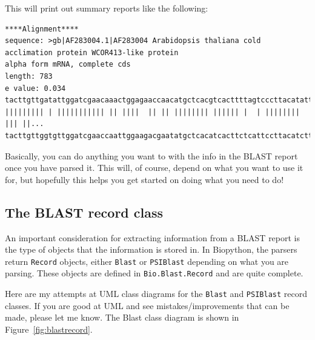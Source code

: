 \documentclass{report}
\begin{document}
This will print out summary reports like the following:

\begin{verbatim}
****Alignment****
sequence: >gb|AF283004.1|AF283004 Arabidopsis thaliana cold acclimation protein WCOR413-like protein
alpha form mRNA, complete cds
length: 783
e value: 0.034
tacttgttgatattggatcgaacaaactggagaaccaacatgctcacgtcacttttagtcccttacatattcctc...
||||||||| | ||||||||||| || ||||  || || |||||||| |||||| |  | |||||||| ||| ||...
tacttgttggtgttggatcgaaccaattggaagacgaatatgctcacatcacttctcattccttacatcttcttc...
\end{verbatim}

Basically, you can do anything you want to with the info in the BLAST
report once you have parsed it. This will, of course, depend on what
you want to use it for, but hopefully this helps you get started on
doing what you need to do!

\subsection{The BLAST record class}

An important consideration for extracting information from a BLAST report is the type of objects that the information is stored in. In Biopython, the parsers return \verb|Record| objects, either \verb|Blast| or \verb|PSIBlast| depending on what you are parsing. These objects are defined in \verb|Bio.Blast.Record| and are quite complete.


Here are my attempts at UML class diagrams for the \verb|Blast| and \verb|PSIBlast| record classes. If you are good at UML and see mistakes/improvements that can be made, please let me know. The Blast class diagram is shown in Figure~\ref{fig:blastrecord}.

\begin{htmlonly}
\label{fig:blastrecord}
\end{htmlonly}
\end{document}
